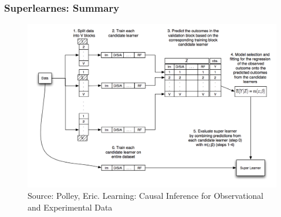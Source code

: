 \documentclass[
  shownotes,
  xcolor={svgnames},
  hyperref={colorlinks,citecolor=DarkBlue,linkcolor=DarkRed,urlcolor=DarkBlue}
  , aspectratio=169]{beamer}
\begin{document}
\begin{frame}[fragile]
\frametitle{Superlearnes: Summary}



  \begin{figure}[H] \centering
            \captionsetup{justification=centering}
              \includegraphics[scale=0.5]{../Lecture24/figures/sl_diagram.png}
              \\
              \tiny
              Source: Polley, Eric. Learning: Causal Inference for Observational and Experimental Data
 \end{figure}

\end{frame}
\end{document}
